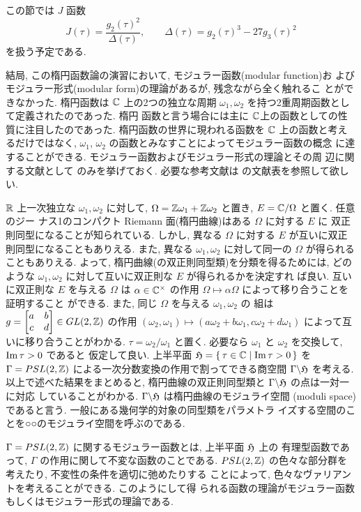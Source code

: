 \documentclass[12pt,twoside]{jarticle}
\def\H{{\frak H}}
\def\Z{{\Bbb Z}} %
\def\R{{\Bbb R}} %
\def\C{{\Bbb C}} %
\def\Impart{\mathop{\text{\rm Im}}\nolimits} %
\begin{document}
この節では $J$ 函数
\[
  J(\tau) = \frac{g_2(\tau)^2}{\Delta(\tau)},
  \qquad
  \Delta(\tau) = g_2(\tau)^3 - 27 g_3(\tau)^2
\]
を扱う予定である.

\bigskip

結局, この楕円函数論の演習において, モジュラー函数(modular function)お
よびモジュラー形式(modular form)の理論があるが, 残念ながら全く触れるこ
とができなかった. 楕円函数は $\C$ 上の2つの独立な周期 %
$\omega_1,\omega_2$ を持つ2重周期函数として定義されたのであった. 楕円
函数と言う場合には主に $\C$上の函数としての性質に注目したのであった. 
楕円函数の世界に現われる函数を $\C$ 上の函数と考えるだけではなく,
$\omega_1$, $\omega_2$ の函数とみなすことによってモジュラー函数の概念
に達することができる. モジュラー函数およびモジュラー形式の理論とその周
辺に関する文献として \cite{Lang2} のみを挙げておく. 必要な参考文献は 
\cite{Lang2} の文献表を参照して欲しい.

$\R$ 上一次独立な $\omega_1,\omega_2$ に対して, %
$\Omega=\Z\omega_1+\Z\omega_2$ と置き, $E=\C/\Omega$ と置く. 任意のジー
ナス1のコンパクト Riemann 面(楕円曲線)はある $\Omega$ に対する $E$ に
双正則同型になることが知られている. しかし, 異なる $\Omega$ に対する %
$E$ が互いに双正則同型になることもありえる. また, 異なる %
$\omega_1,\omega_2$ に対して同一の $\Omega$ が得られることもありえる.
よって, 楕円曲線(の双正則同型類)を分類を得るためには, どのような %
$\omega_1,\omega_2$ に対して互いに双正則な $E$ が得られるかを決定すれ
ば良い. 互いに双正則な $E$ を与える $\Omega$ は $\alpha\in\C^{\times}$ 
の作用 $\Omega\mapsto\alpha\Omega$ によって移り合うことを証明すること
ができる. また, 同じ $\Omega$ を与える $\omega_1,\omega_2$ の
組は $g=\begin{bmatrix}a&b\\c&d\end{bmatrix}\in GL(2,\Z)$ の作用 %
$(\omega_2,\omega_1)\mapsto(a\omega_2+b\omega_1,c\omega_2+d\omega_1)$ %
によって互いに移り合うことがわかる. $\tau=\omega_2/\omega_1$ と置く. 
必要なら $\omega_1$ と $\omega_2$ を交換して, $\Impart\tau>0$ であると
仮定して良い. 上半平面 $\frak H=\{\,\tau\in\C\mid\Impart\tau>0\,\}$ を %
$\Gamma=PSL(2,\Z)$ による一次分数変換の作用で割ってできる商空間 %
$\Gamma\backslash\frak H$ を考える. 以上で述べた結果をまとめると, %
楕円曲線の双正則同型類と $\Gamma\backslash\frak H$ の点は一対一に対応
していることがわかる. $\Gamma\backslash\H$ は楕円曲線のモジュライ空間
(moduli space)であると言う. 一般にある幾何学的対象の同型類をパラメトラ
イズする空間のことを○○のモジュライ空間を呼ぶのである.

$\Gamma=PSL(2,\Z)$ に関するモジュラー函数とは, 上半平面 $\frak H$ 上の
有理型函数であって, $\Gamma$ の作用に関して不変な函数のことである. %
$PSL(2,\Z)$ の色々な部分群を考えたり, 不変性の条件を適切に弛めたりする
ことによって, 色々なヴァリアントを考えることができる. このようにして得
られる函数の理論がモジュラー函数もしくはモジュラー形式の理論である.
\end{document}
